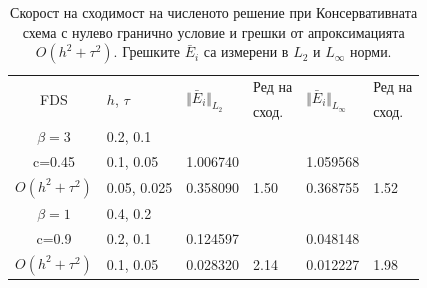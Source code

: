 \documentclass{article}
\begin{document}
\begin{table}[ht]
\centering
\small
		\begin{tabular}{||c|l|ll|ll||}
			\hline
			\hline
      \multirow{2  }{*}{FDS}        & \multirow{2  }{*}{$h$, $\tau$}  &	\multirow{2  }{*}{  $\Vert \bar E_i \Vert_{L_2} $ } 	&Ред на & \multirow{2  }{*}{  $\Vert \bar E_i \Vert_{L_\infty}$ }	&Ред на   \\
	                                        &                                                &    										&  сход. & 										& сход. \\
   			\hline 
					\hline 
  $\beta=3$                &0.2, 0.1         &                    &                &                  &                   \\
   c=0.45                     &0.1, 0.05         & 1.006740   &                & 1.059568 &                   \\
     $O(h^2 + \tau^ 2)$ &0.05, 0.025  &0.358090    	& 1.50       	& 0.368755   &   1.52   \\
	   \hline
			\hline 
       $\beta=1$           & 0.4, 0.2       &                   &           &                 &   \\
                  c=0.9       & 0.2, 0.1        & 0.124597   &          &0.048148  &   \\
  $O(h^2+ \tau^2)$  & 0.1, 0.05       & 0.028320   & 2.14  &0.012227  & 1.98 \\
	   \hline
			\hline 
		\end{tabular}
		\caption{Скорост на сходимост на численото решение при Консервативната схема с нулево гранично условие и грешки от апроксимацията $O(h^{2} + \tau^2 )$. Грешките $\bar E_i$ са измерени в $L_2$ и $L_\infty$ норми.}
\label{tableC}
\end{table}
\end{document}
